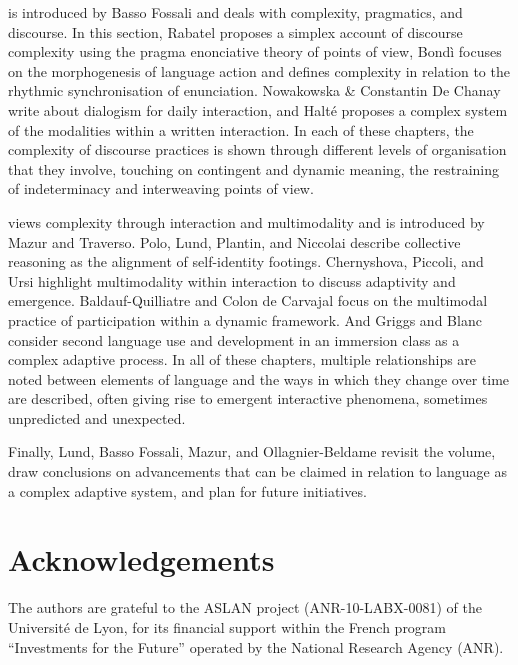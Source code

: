 \documentclass[output=paper]{langscibook}
\begin{document}
 is introduced by Basso Fossali and deals with complexity, pragmatics, and discourse. In this section, Rabatel proposes a simplex account of discourse complexity using the pragma enonciative theory of points of view, Bondì focuses on the morphogenesis of language action and defines complexity in relation to the rhythmic synchronisation of enunciation. Nowakowska \& Constantin De Chanay write about dialogism for daily interaction, and Halté proposes a complex system of the modalities within a written interaction. In each of these chapters, the complexity of discourse practices is shown through different levels of organisation that they involve, touching on contingent and dynamic meaning, the restraining of indeterminacy and interweaving points of view.

 views complexity through interaction and multimodality and is introduced by Mazur and Traverso. Polo, Lund, Plantin, and Niccolai describe collective reasoning as the alignment of self-identity footings. Chernyshova, Piccoli, and Ursi highlight multimodality within interaction to discuss adaptivity and emergence. Baldauf-Quilliatre and Colon de Carvajal focus on the multimodal practice of participation within a dynamic framework. And Griggs and Blanc consider second language use and development in an immersion class as a complex adaptive process. In all of these chapters, multiple relationships are noted between elements of language and the ways in which they change over time are described, often giving rise to emergent interactive phenomena, sometimes unpredicted and unexpected.  

Finally, Lund, Basso Fossali, Mazur, and Ollagnier-Beldame revisit the volume, draw conclusions on advancements that can be claimed in relation to language as a complex adaptive system, and plan for future initiatives.

\section*{Acknowledgements}
The authors are grateful to the ASLAN project (ANR-10-LABX-0081) of the Université de Lyon, for its financial support within the French program “Investments for the Future” operated by the National Research Agency (ANR).

{\sloppy\printbibliography[heading=subbibliography,notkeyword=this]}
\end{document}
